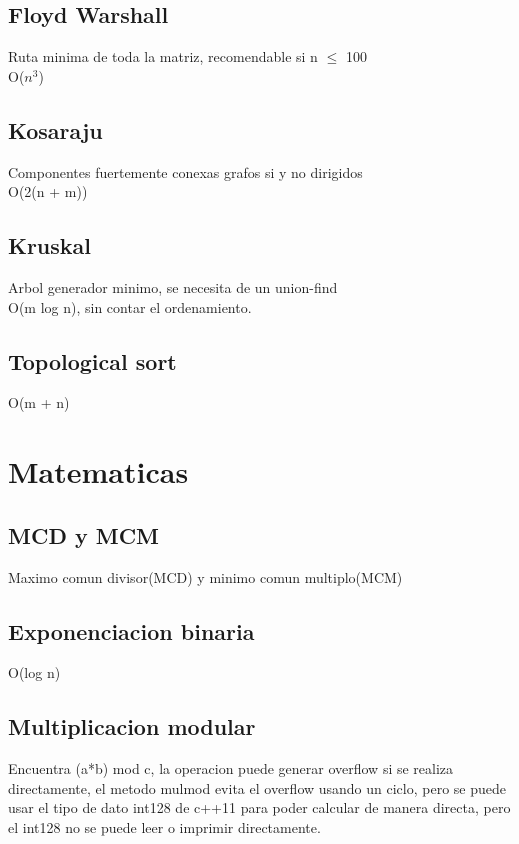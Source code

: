 \documentclass[10pt,landscape,twocolumn,a4paper,notitlepage]{article}
\newcommand\cppfile[2][]{

}
\begin{document}
			\subsection{Floyd Warshall}
			Ruta minima de toda la matriz, recomendable si n $\leq$ 100\\	
			O($n^{3}$)
			\cppfile[4-19]{grafos/floyd.cpp}
			\subsection{Kosaraju}
			Componentes fuertemente conexas grafos si y no dirigidos\\
			O(2(n + m))
			\cppfile[7-45]{grafos/kosaraju.cpp}
			\subsection{Kruskal}
			Arbol generador minimo, se necesita de un union-find\\
			O(m log n), sin contar el ordenamiento.
			\cppfile[43-67]{grafos/kruskal.cpp}
			\subsection{Topological sort}
			O(m + n)
			\cppfile[7-31]{grafos/topological_sort_para_grafos_ciclicos.cpp}
			
		\section{Matematicas}
			\subsection{MCD y MCM}
			Maximo comun divisor(MCD) y minimo comun multiplo(MCM)
			\cppfile[5-11]{matematicas/MCD_y_MCM.cpp}
			\subsection{Exponenciacion binaria}
			O(log n)
			\cppfile[4-15]{matematicas/exponenciacion_binaria.cpp}
			\subsection{Multiplicacion modular}
			Encuentra (a*b) mod c, la operacion puede generar overflow
				si se realiza directamente, el metodo mulmod evita el overflow usando un
				ciclo, pero se puede usar el tipo de dato int128 de c++11 para poder calcular
				de manera directa, pero el int128 no se puede leer o imprimir directamente.
			\cppfile[5-26]{matematicas/mulmod.cpp}
\end{document}
